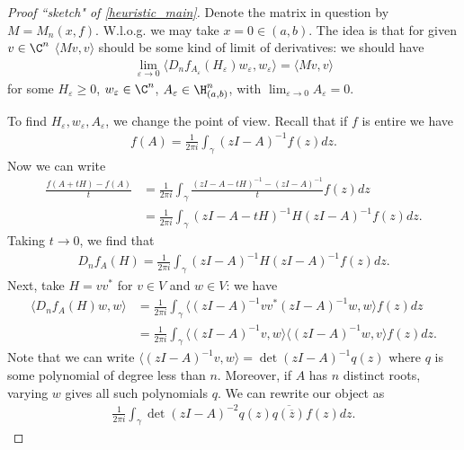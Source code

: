 \begin{proof}[Proof ``sketch" of \ref{heuristic_main}]
	Denote the matrix in question by $M = M_{n}(x, f)$. W.l.o.g. we may take $x = 0 \in (a, b)$. The idea is that for given $v \in \C^{n}$ $\langle M v, v \rangle$ should be some kind of limit of derivatives: we should have
	\begin{align*}
		\lim_{\varepsilon \to 0} \langle D_{n} f_{A_{\varepsilon}} (H_{\varepsilon}) w_{\varepsilon}, w_{\varepsilon} \rangle = \langle M v, v \rangle
	\end{align*}
	for some $H_{\varepsilon} \geq 0$, $w_{\varepsilon} \in \C^{n}$, $A_{\varepsilon} \in \H^{n}_{(a, b)}$, with $\lim_{\varepsilon \to 0} A_{\varepsilon} = 0$.

	To find $H_{\varepsilon}, w_{\varepsilon}, A_{\varepsilon}$, we change the point of view. Recall that if $f$ is entire we have
	\begin{align*}
	f(A) = \frac{1}{2 \pi i}\int_{\gamma} (z I - A)^{-1} f(z) dz.
	\end{align*}
	Now we can write
	\begin{align*}
		\frac{f(A + t H) - f(A)}{t} &= \frac{1}{2 \pi i}\int_{\gamma} \frac{(z I - A - t H)^{-1} - (z I - A)^{-1}}{t} f(z) dz \\
		&= \frac{1}{2 \pi i}\int_{\gamma} (z I - A - t H)^{-1} H (z I - A)^{-1} f(z) dz.
	\end{align*}
	Taking $t \to 0$, we find that
	\begin{align*}
		D_{n} f_{A}(H) = \frac{1}{2 \pi i}\int_{\gamma} (z I - A)^{-1} H (z I - A)^{-1} f(z) dz.
	\end{align*}
	Next, take $H = v v^{*}$ for $v \in V$ and $w \in V$: we have
	\begin{align*}
		\langle D_{n} f_{A}(H) w, w \rangle &= \frac{1}{2 \pi i}\int_{\gamma} \langle (z I - A)^{-1} v v^{*} (z I - A)^{-1} w, w \rangle f(z) dz \\
		&= \frac{1}{2 \pi i}\int_{\gamma} \langle (z I - A)^{-1} v, w \rangle \langle (z I - A)^{-1} w, v \rangle f(z) dz.
	\end{align*}
	Note that we can write $\langle (z I - A)^{-1} v, w \rangle = \det(z I - A)^{-1} q(z)$ where $q$ is some polynomial of degree less than $n$. Moreover, if $A$ has $n$ distinct roots, varying $w$ gives all such polynomials $q$. We can rewrite our object as
	\begin{align*}
		\frac{1}{2 \pi i}\int_{\gamma} \det(z I - A)^{-2} q(z) \overline{q(\overline{z})} f(z) dz.
	\end{align*}

\end{proof}
